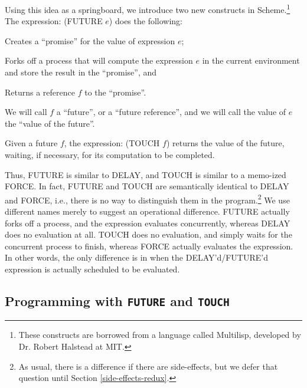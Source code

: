 Using this idea as a springboard, we introduce two new constructs in
Scheme.\footnote{
 These constructs are borrowed from a language called Multilisp,  developed
by Dr. Robert Halstead at MIT.
}
The expression:
\beginlisp
(FUTURE $e$)
\endlisp
does the following:
\begin{tightlist}

\item Creates a ``promise'' for the value of expression $e$;

\item Forks off a process that will compute the expression $e$
in the current environment and store the result in the ``promise'', and

\item Returns a reference $f$ to the ``promise''.

\end{tightlist}
We will call $f$ a ``future'', or a ``future reference'', and we will call
the value of $e$ the ``value of the future''.

Given a future $f$, the expression:
\beginlisp
(TOUCH $f$)
\endlisp
 returns the value of the future, waiting, if necessary, for its computation
to be completed.

Thus, {\cf FUTURE} is similar to {\cf DELAY}, and {\cf TOUCH} is similar to a
memo-ized {\cf FORCE}.  In fact, {\cf FUTURE} and {\cf TOUCH} are
semantically identical to {\cf DELAY} and {\cf FORCE}, i.e., there is no way
to distinguish them in the program.\footnote{
 As usual, there is a difference if there are side-effects, but we defer that
question until Section \ref{side-effects-redux}.
}
 We use different names merely to suggest an operational difference.  {\cf
FUTURE} actually forks off a process, and the expression evaluates
concurrently, whereas {\cf DELAY} does no evaluation at all.  {\cf
TOUCH} does no evaluation, and simply waits for the concurrent process to
finish, whereas {\cf FORCE} actually evaluates the expression.  In other
words, the only difference is in when the {\cf DELAY}'d/{\cf FUTURE}'d 
expression is actually scheduled to be evaluated.

\subsection{Programming with {\tt FUTURE} and {\tt TOUCH}}

\label{programming-with-future-and-touch}

